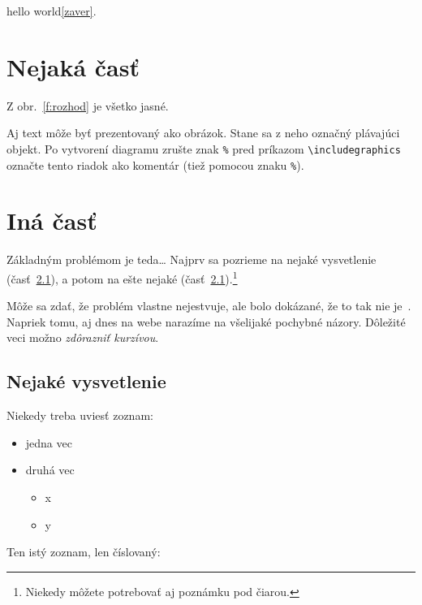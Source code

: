 \documentclass[10pt,twoside,slovak,a4paper]{coursepaper}
\begin{document}
hello world\ref{zaver}.



\section{Nejaká časť} \label{nejaka}

Z obr.~\ref{f:rozhod} je všetko jasné. 

\begin{figure*}[tbh]
\centering
Aj text môže byť prezentovaný ako obrázok. Stane sa z neho označný plávajúci objekt. Po vytvorení diagramu zrušte znak \texttt{\%} pred príkazom \verb|\includegraphics| označte tento riadok ako komentár (tiež pomocou znaku \texttt{\%}).
\caption{Rozhodujúci argument.}
\label{f:rozhod}
\end{figure*}



\section{Iná časť} \label{ina}

Základným problémom je teda\ldots{} Najprv sa pozrieme na nejaké vysvetlenie (časť~\ref{ina:nejake}), a potom na ešte nejaké (časť~\ref{ina:nejake}).\footnote{Niekedy môžete potrebovať aj poznámku pod čiarou.}

Môže sa zdať, že problém vlastne nejestvuje\cite{Coplien:MPD}, ale bolo dokázané, že to tak nie je~\cite{Czarnecki:Staged, Czarnecki:Progress}. Napriek tomu, aj dnes na webe narazíme na všelijaké pochybné názory\cite{PLP-Framework}. Dôležité veci možno \emph{zdôrazniť kurzívou}.


\subsection{Nejaké vysvetlenie} \label{ina:nejake}

Niekedy treba uviesť zoznam:

\begin{itemize}
\item jedna vec
\item druhá vec
	\begin{itemize}
	\item x
	\item y
	\end{itemize}
\end{itemize}

Ten istý zoznam, len číslovaný:
\end{document}

